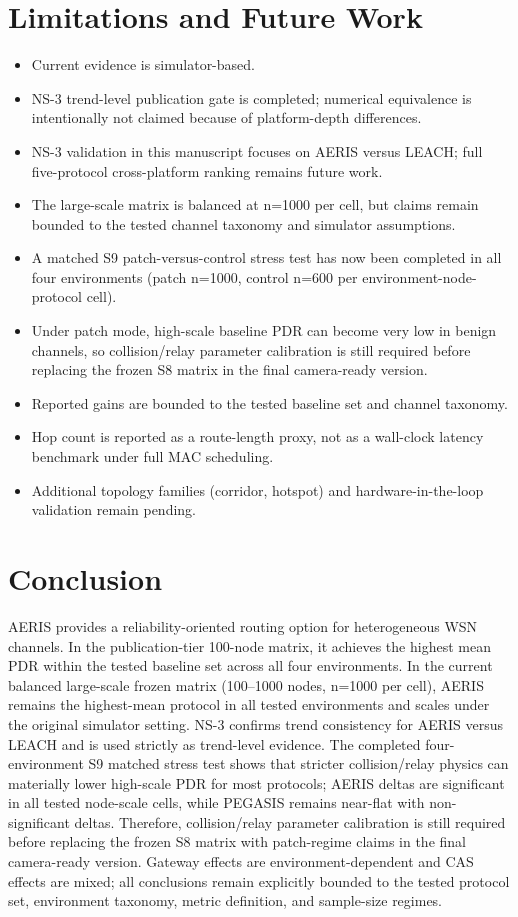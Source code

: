 \documentclass[sensors,article,submit,moreauthors,pdftex]{Definitions/mdpi}
\begin{document}
\section{Limitations and Future Work}
\begin{itemize}
\item Current evidence is simulator-based.
\item NS-3 trend-level publication gate is completed; numerical equivalence is intentionally not claimed because of platform-depth differences.
\item NS-3 validation in this manuscript focuses on AERIS versus LEACH; full five-protocol cross-platform ranking remains future work.
\item The large-scale matrix is balanced at n=1000 per cell, but claims remain bounded to the tested channel taxonomy and simulator assumptions.
\item A matched S9 patch-versus-control stress test has now been completed in all four environments (patch n=1000, control n=600 per environment-node-protocol cell).
\item Under patch mode, high-scale baseline PDR can become very low in benign channels, so collision/relay parameter calibration is still required before replacing the frozen S8 matrix in the final camera-ready version.
\item Reported gains are bounded to the tested baseline set and channel taxonomy.
\item Hop count is reported as a route-length proxy, not as a wall-clock latency benchmark under full MAC scheduling.
\item Additional topology families (corridor, hotspot) and hardware-in-the-loop validation remain pending.
\end{itemize}

\section{Conclusion}
AERIS provides a reliability-oriented routing option for heterogeneous WSN channels. In the publication-tier 100-node matrix, it achieves the highest mean PDR within the tested baseline set across all four environments. In the current balanced large-scale frozen matrix (100--1000 nodes, n=1000 per cell), AERIS remains the highest-mean protocol in all tested environments and scales under the original simulator setting. NS-3 confirms trend consistency for AERIS versus LEACH and is used strictly as trend-level evidence. The completed four-environment S9 matched stress test shows that stricter collision/relay physics can materially lower high-scale PDR for most protocols; AERIS deltas are significant in all tested node-scale cells, while PEGASIS remains near-flat with non-significant deltas. Therefore, collision/relay parameter calibration is still required before replacing the frozen S8 matrix with patch-regime claims in the final camera-ready version. Gateway effects are environment-dependent and CAS effects are mixed; all conclusions remain explicitly bounded to the tested protocol set, environment taxonomy, metric definition, and sample-size regimes.
\end{document}
